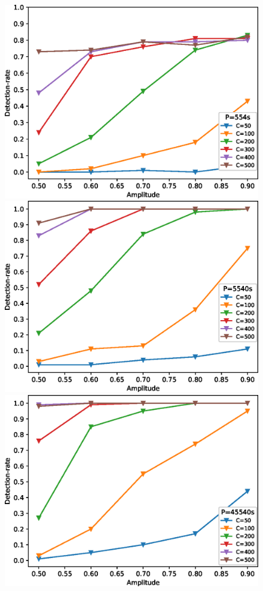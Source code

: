 \documentclass[fleqn,usenatbib]{mnras}
\begin{document}
\begin{figure}
\begin{minipage}[b]{0.45\textwidth}
\includegraphics[width=\textwidth]{./figure/sim_LW/detection_554_temp.eps}
\includegraphics[width=\textwidth]{./figure/sim_LW/detection_5540_temp.eps}
\includegraphics[width=\textwidth]{./figure/sim_LW/detection_45540_temp.eps}

\end{minipage}
\end{figure}
\end{document}
